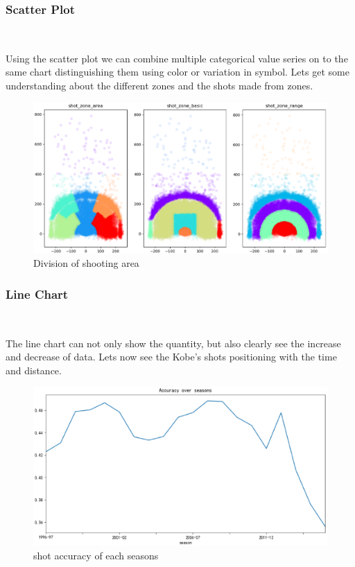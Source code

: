 \subsubsection{Scatter Plot}
\

Using the scatter plot we can combine multiple 
categorical value series on to the same chart distinguishing them using color or 
variation in symbol.
Lets get some understanding about the different zones and the shots made from zones.
\begin{figure}[H]
		\centering
	\includegraphics[scale=0.3]{h.eps
	}        %
	\caption{Division of shooting area}
	\label{fig4}

\end{figure}

\subsubsection{Line Chart}
\

The line chart can not only show the quantity, but also clearly see the increase and decrease of data.
Lets now see the Kobe's shots positioning with the time and distance.

\begin{figure}[H]
	\centering
	\includegraphics[scale=0.2]{m.eps
	}        %
	\caption{shot accuracy of each seasons}
	\label{fig5}
\end{figure}

